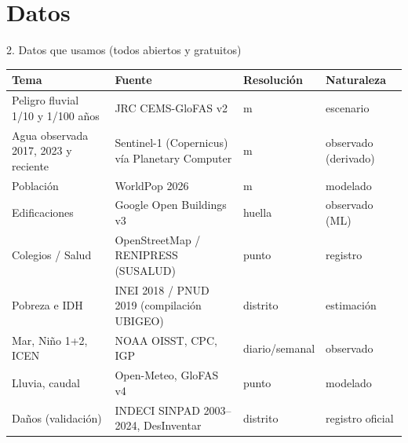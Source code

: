 \documentclass[aspectratio=169,11pt]{beamer}
\begin{document}
\section{Datos}
\begin{frame}{2. Datos que usamos (todos abiertos y gratuitos)}
\scriptsize
\renewcommand{\arraystretch}{1.12}
\begin{tabularx}{\textwidth}{>{\raggedright\arraybackslash}p{3.8cm}>{\raggedright\arraybackslash}X>{\raggedright\arraybackslash}p{1.8cm}>{\raggedright\arraybackslash}p{2.4cm}}\toprule
\textbf{Tema} & \textbf{Fuente} & \textbf{Resolución} & \textbf{Naturaleza}\\\midrule
Peligro fluvial 1/10 y 1/100 años & JRC CEMS-GloFAS v2 & 90 m & escenario\\
Agua observada 2017, 2023 y reciente & Sentinel-1 (Copernicus) vía Planetary Computer & 55 m & observado (derivado)\\
Población & WorldPop 2026 & 100 m & modelado\\
Edificaciones & Google Open Buildings v3 & huella & observado (ML)\\
Colegios / Salud & OpenStreetMap / RENIPRESS (SUSALUD) & punto & registro\\
Pobreza e IDH & INEI 2018 / PNUD 2019 (compilación UBIGEO) & distrito & estimación\\
Mar, Niño 1+2, ICEN & NOAA OISST, CPC, IGP & diario/semanal & observado\\
Lluvia, caudal & Open-Meteo, GloFAS v4 & punto & modelado\\
Daños (validación) & INDECI SINPAD 2003--2024, DesInventar & distrito & registro oficial\\\bottomrule
\end{tabularx}
\end{frame}
\end{document}
